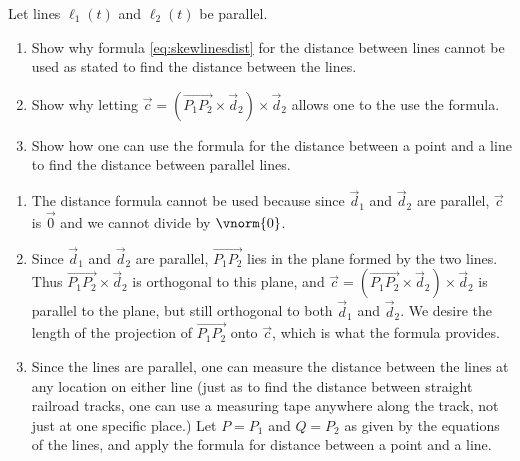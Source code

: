 {Let lines $\ell_1(t)$ and $\ell_2(t)$ be parallel. 
\begin{enumerate}
	\item Show why formula \eqref{eq:skewlinesdist} for the distance between lines cannot be used as stated to find the distance between the lines.
	\item	Show why letting $\vec{c}=(\overrightarrow{P_1P_2}\times\vec d_2)\times\vec d_2$ allows one to the use the formula.
	\item	Show how one can use the formula for the distance between a point and a line to find the distance between parallel lines.	
\end{enumerate}
}
{\begin{enumerate}
	\item The distance formula cannot be used because since $\vec d_1$ and $\vec d_2$ are parallel, $\vec c$ is $\vec 0$ and we cannot divide by $\vnorm{0}$.
	\item	Since $\vec d_1$ and $\vec d_2$ are parallel, $\overrightarrow{P_1P_2}$ lies in the plane formed by the two lines. Thus $\overrightarrow{P_1P_2}\times\vec d_2$ is orthogonal to this plane, and $\vec c=(\overrightarrow{P_1P_2}\times\vec d_2)\times \vec d_2$ is parallel to the plane, but still orthogonal to both $\vec d_1$ and $\vec d_2$. We desire the length of the projection of $\overrightarrow{P_1P_2}$ onto $\vec c$, which is what the formula provides.
	\item		Since the lines are parallel, one can measure the distance between the lines at any location on either line (just as to find the distance between straight railroad tracks, one can use a measuring tape anywhere along the track, not just at one specific place.) Let $P=P_1$ and $Q=P_2$ as given by the equations of the lines, and apply the formula for distance between a point and a line.
\end{enumerate}


}

